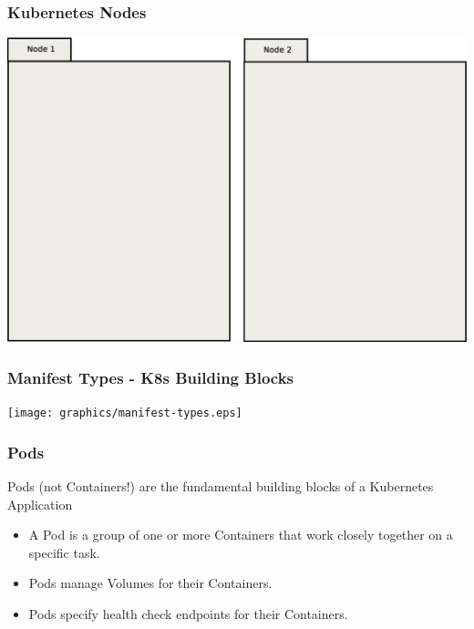     \begin{frame}
        \frametitle{Kubernetes Nodes}
        \includegraphics[width=\textwidth,height=0.85\textheight,keepaspectratio]{graphics/00-nodes.eps}
    \end{frame}

    \begin{frame}
        \frametitle{Manifest Types - K8s Building Blocks}
        \texttt{[image: graphics/manifest-types.eps]}
    \end{frame}

    \begin{frame}
        \frametitle{Pods}
        Pods (not Containers!) are the fundamental building blocks of a Kubernetes Application\pause
        \begin{itemize}
            \item A Pod is a group of one or more Containers that work closely together on a specific task.\pause
            \item Pods manage Volumes for their Containers.\pause
            \item Pods specify health check endpoints for their Containers.\pause
        \end{itemize}
    \end{frame}

